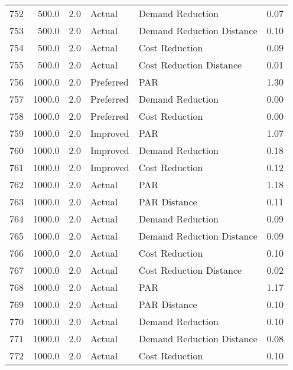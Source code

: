 \begin{longtable}{lrrllr}
752  &        500.0 &     2.0 &         Actual &           Demand Reduction &   0.07 \\
753  &        500.0 &     2.0 &         Actual &  Demand Reduction Distance &   0.10 \\
754  &        500.0 &     2.0 &         Actual &             Cost Reduction &   0.09 \\
755  &        500.0 &     2.0 &         Actual &    Cost Reduction Distance &   0.01 \\
756  &       1000.0 &     2.0 &      Preferred &                        PAR &   1.30 \\
757  &       1000.0 &     2.0 &      Preferred &           Demand Reduction &   0.00 \\
758  &       1000.0 &     2.0 &      Preferred &             Cost Reduction &   0.00 \\
759  &       1000.0 &     2.0 &       Improved &                        PAR &   1.07 \\
760  &       1000.0 &     2.0 &       Improved &           Demand Reduction &   0.18 \\
761  &       1000.0 &     2.0 &       Improved &             Cost Reduction &   0.12 \\
762  &       1000.0 &     2.0 &         Actual &                        PAR &   1.18 \\
763  &       1000.0 &     2.0 &         Actual &               PAR Distance &   0.11 \\
764  &       1000.0 &     2.0 &         Actual &           Demand Reduction &   0.09 \\
765  &       1000.0 &     2.0 &         Actual &  Demand Reduction Distance &   0.09 \\
766  &       1000.0 &     2.0 &         Actual &             Cost Reduction &   0.10 \\
767  &       1000.0 &     2.0 &         Actual &    Cost Reduction Distance &   0.02 \\
768  &       1000.0 &     2.0 &         Actual &                        PAR &   1.17 \\
769  &       1000.0 &     2.0 &         Actual &               PAR Distance &   0.10 \\
770  &       1000.0 &     2.0 &         Actual &           Demand Reduction &   0.10 \\
771  &       1000.0 &     2.0 &         Actual &  Demand Reduction Distance &   0.08 \\
772  &       1000.0 &     2.0 &         Actual &             Cost Reduction &   0.10 \\

\end{longtable}

